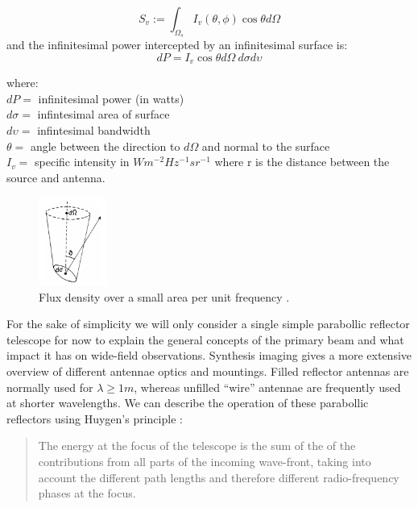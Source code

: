 \documentclass[a4paper,10pt]{report}
\begin{document}
  \begin{equation}
    S_v := \int_{\Omega_s}{I_v(\theta,\phi)\cos{\theta}d\Omega}
  \end{equation}
  and the infinitesimal power intercepted by an infinitesimal surface is:
  \begin{equation}
    dP = I_v\cos{\theta}d\Omega\ d\sigma d\upsilon
  \end{equation}

  where:\\
  $dP = $ infinitesimal power (in watts)\\
  $d\sigma = $ infintesimal area of surface\\
  $d\upsilon = $ infintesimal bandwidth\\
  $\theta = $ angle between the direction to $d\Omega$ and normal to the surface\\
  $I_{v} =$ specific intensity in $Wm^{-2}Hz^{-1}sr^{-1}$ where r is the distance between the source and antenna.\\
  
\begin{figure}[ht]
\begin{mdframed}
 \centering
 \includegraphics[width=0.2\textwidth]{images/measuring_source_brightness.png}
 \caption[Source brightness]{Flux density over a small area per unit frequency \cite{wilson2009tools}.}
 \label{fig_measuring_source_brightness}
\end{mdframed}
\end{figure}

For the sake of simplicity we will only consider a single simple parabollic reflector telescope for now to explain the general concepts of the primary beam and what impact it has on wide-field observations. Synthesis imaging \cite[ch. 3]{taylor1999synthesis} 
gives a more extensive overview of different antennae optics and mountings. Filled reflector antennas are normally used for $\lambda \geq 1m$, whereas unfilled ``wire'' antennae are frequently used at shorter wavelengths. We can describe
the operation of these parabollic reflectors using Huygen's principle \cite{christiansenradiotelescopes}: 
\begin{quote}
The energy at the focus of the telescope is the sum of the of the contributions from all parts of the incoming wave-front, taking into account the different path lengths and therefore different radio-frequency phases at the focus.
\end{quote}
\end{document}
